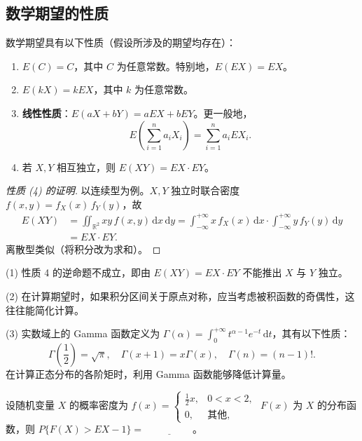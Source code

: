 ﻿\documentclass[lang=cn,11pt]{elegantbook}
\begin{document}
\subsection{数学期望的性质}

\begin{property}\label{prop:expectation}
数学期望具有以下性质（假设所涉及的期望均存在）：
\begin{enumerate}
    \item \(E(C) = C\)，其中 \(C\) 为任意常数。特别地，\(E(EX) = EX\)。
    \item \(E(kX) = kEX\)，其中 \(k\) 为任意常数。
    \item \textbf{线性性质}：\(E(aX + bY) = aEX + bEY\)。更一般地，
    \[
    E\!\left(\sum_{i=1}^{n} a_i X_i\right) = \sum_{i=1}^{n} a_i EX_i.
    \]
    \item 若 \(X, Y\) 相互独立，则 \(E(XY) = EX \cdot EY\)。
\end{enumerate}
\end{property}
\begin{proof}[性质 (4) 的证明]
以连续型为例。\(X, Y\) 独立时联合密度 \(f(x,y) = f_X(x)\,f_Y(y)\)，故
\begin{align*}
E(XY) &= \iint_{\mathbb{R}^2} xy\,f(x,y)\,\mathrm{d}x\,\mathrm{d}y
= \int_{-\infty}^{+\infty} x\,f_X(x)\,\mathrm{d}x \cdot \int_{-\infty}^{+\infty} y\,f_Y(y)\,\mathrm{d}y \\
&= EX \cdot EY.
\end{align*}
离散型类似（将积分改为求和）。
\end{proof}

\begin{note}
(1) 性质 4 的逆命题不成立，即由 \(E(XY) = EX \cdot EY\) 不能推出 \(X\) 与 \(Y\) 独立。\par
(2) 在计算期望时，如果积分区间关于原点对称，应当考虑被积函数的奇偶性，这往往能简化计算。\par
(3) 实数域上的 Gamma 函数定义为 \(\Gamma(\alpha) = \int_0^{+\infty} t^{\alpha-1}e^{-t}\,\mathrm{d}t\)，其有以下性质：
\[
\Gamma\!\left(\frac{1}{2}\right) = \sqrt{\pi},\quad \Gamma(x+1) = x\Gamma(x),\quad \Gamma(n) = (n-1)!.
\]
在计算正态分布的各阶矩时，利用 Gamma 函数能够降低计算量。
\end{note}


\begin{exercise}\label{exer:4-6-fx}
设随机变量 \(X\) 的概率密度为 \(f(x) = \begin{cases} \frac12x, & 0 < x < 2, \\ 0, & \text{其他}, \end{cases}\) \(F(x)\) 为 \(X\) 的分布函数，则 \(P\{F(X) > EX - 1\} =\,\underline{\hspace{2cm}}\)。
\end{exercise}
\end{document}
